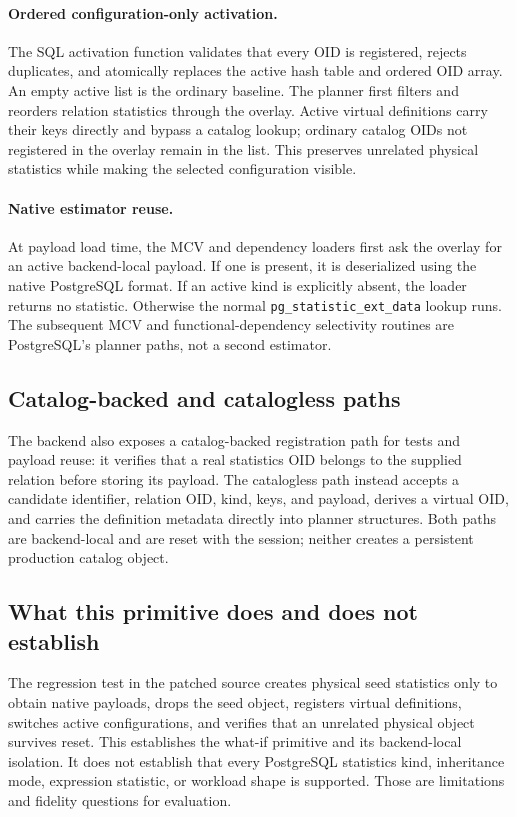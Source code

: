 \paragraph{Ordered configuration-only activation.}

The SQL activation function validates that every OID is registered, rejects
duplicates, and atomically replaces the active hash table and ordered OID
array. An empty active list is the ordinary baseline. The planner first
filters and reorders relation statistics through the overlay. Active virtual
definitions carry their keys directly and bypass a catalog lookup; ordinary
catalog OIDs not registered in the overlay remain in the list. This preserves
unrelated physical statistics while making the selected configuration visible.

\paragraph{Native estimator reuse.}
At payload load time, the MCV and dependency loaders first ask the overlay for
an active backend-local payload. If one is present, it is deserialized using
the native PostgreSQL format. If an active kind is explicitly absent, the
loader returns no statistic. Otherwise the normal
\texttt{pg\_statistic\_ext\_data} lookup runs. The subsequent MCV and
functional-dependency selectivity routines are PostgreSQL's planner paths, not
a second estimator.

\subsection{Catalog-backed and catalogless paths}

The backend also exposes a catalog-backed registration path for tests and
payload reuse: it verifies that a real statistics OID belongs to the supplied
relation before storing its payload. The catalogless path instead accepts a
candidate identifier, relation OID, kind, keys, and payload, derives a virtual
OID, and carries the definition metadata directly into planner structures.
Both paths are backend-local and are reset with the session; neither creates a
persistent production catalog object.

\subsection{What this primitive does and does not establish}

The regression test in the patched source creates physical seed statistics
only to obtain native payloads, drops the seed object, registers virtual
definitions, switches active configurations, and verifies that an unrelated
physical object survives reset. This establishes the what-if primitive and
its backend-local isolation. It does not establish that every PostgreSQL
statistics kind, inheritance mode, expression statistic, or workload shape is
supported. Those are limitations and fidelity questions for evaluation.
